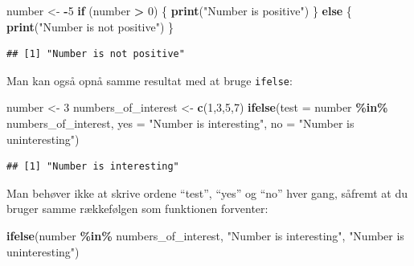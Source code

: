 \documentclass[
]{book}
\newenvironment{Shaded}{\begin{snugshade}}{\end{snugshade}}
\newcommand{\AttributeTok}[1]{\textcolor[rgb]{0.13,0.29,0.53}{#1}}
\newcommand{\ControlFlowTok}[1]{\textcolor[rgb]{0.13,0.29,0.53}{\textbf{#1}}}
\newcommand{\DecValTok}[1]{\textcolor[rgb]{0.00,0.00,0.81}{#1}}
\newcommand{\FunctionTok}[1]{\textcolor[rgb]{0.13,0.29,0.53}{\textbf{#1}}}
\newcommand{\NormalTok}[1]{#1}
\newcommand{\OtherTok}[1]{\textcolor[rgb]{0.56,0.35,0.01}{#1}}
\newcommand{\SpecialCharTok}[1]{\textcolor[rgb]{0.81,0.36,0.00}{\textbf{#1}}}
\newcommand{\StringTok}[1]{\textcolor[rgb]{0.31,0.60,0.02}{#1}}
\theoremstyle{definition}
\theoremstyle{definition}
\theoremstyle{definition}
\theoremstyle{definition}
\theoremstyle{remark}
\begin{document}
\begin{Shaded}
\begin{Highlighting}[]
\NormalTok{number }\OtherTok{\textless{}{-}} \SpecialCharTok{{-}}\DecValTok{5}
\ControlFlowTok{if}\NormalTok{ (number }\SpecialCharTok{\textgreater{}} \DecValTok{0}\NormalTok{) \{}
  \FunctionTok{print}\NormalTok{(}\StringTok{"Number is positive"}\NormalTok{)}
\NormalTok{\} }\ControlFlowTok{else}\NormalTok{ \{}
  \FunctionTok{print}\NormalTok{(}\StringTok{"Number is not positive"}\NormalTok{)}
\NormalTok{\}}
\end{Highlighting}
\end{Shaded}

\begin{verbatim}
## [1] "Number is not positive"
\end{verbatim}

Man kan også opnå samme resultat med at bruge \texttt{ifelse}:

\begin{Shaded}
\begin{Highlighting}[]
\NormalTok{number }\OtherTok{\textless{}{-}} \DecValTok{3}
\NormalTok{numbers\_of\_interest }\OtherTok{\textless{}{-}} \FunctionTok{c}\NormalTok{(}\DecValTok{1}\NormalTok{,}\DecValTok{3}\NormalTok{,}\DecValTok{5}\NormalTok{,}\DecValTok{7}\NormalTok{)}
\FunctionTok{ifelse}\NormalTok{(}\AttributeTok{test =}\NormalTok{ number }\SpecialCharTok{\%in\%}\NormalTok{ numbers\_of\_interest, }
       \AttributeTok{yes =} \StringTok{"Number is interesting"}\NormalTok{,}
       \AttributeTok{no =}  \StringTok{"Number is uninteresting"}\NormalTok{)}
\end{Highlighting}
\end{Shaded}

\begin{verbatim}
## [1] "Number is interesting"
\end{verbatim}

Man behøver ikke at skrive ordene ``test'', ``yes'' og ``no'' hver gang, såfremt at du bruger samme rækkefølgen som funktionen forventer:

\begin{Shaded}
\begin{Highlighting}[]
\FunctionTok{ifelse}\NormalTok{(number }\SpecialCharTok{\%in\%}\NormalTok{ numbers\_of\_interest, }
       \StringTok{"Number is interesting"}\NormalTok{,}
       \StringTok{"Number is uninteresting"}\NormalTok{)}
\end{Highlighting}
\end{Shaded}
\end{document}
